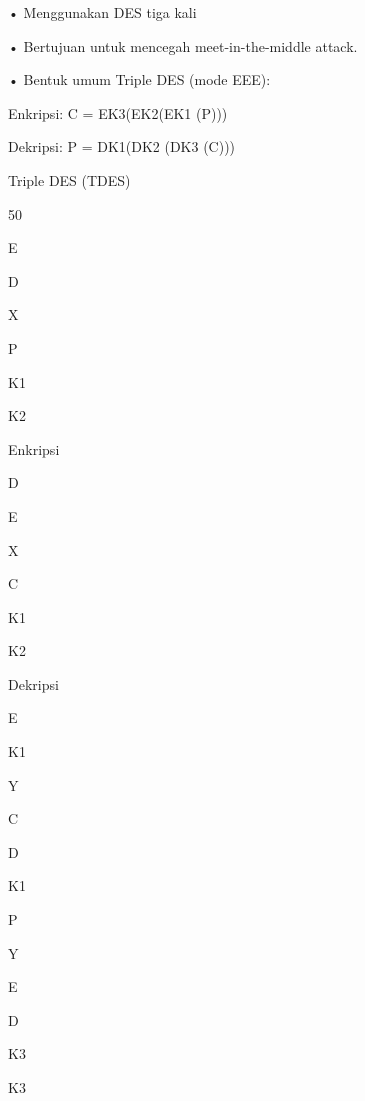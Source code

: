 \documentclass{article}
\begin{document}

• Menggunakan DES tiga kali

• Bertujuan untuk mencegah meet-in-the-middle attack.

• Bentuk umum Triple DES (mode EEE):


Enkripsi: C = EK3(EK2(EK1 (P)))


Dekripsi: P = DK1(DK2 (DK3 (C))) 

Triple DES (TDES)

50

E

D

X

P

K1

K2

Enkripsi

D

E

X

C

K1

K2

Dekripsi

E

K1

Y

C

D

K1

P

Y

E

D

K3

K3
\end{document}
